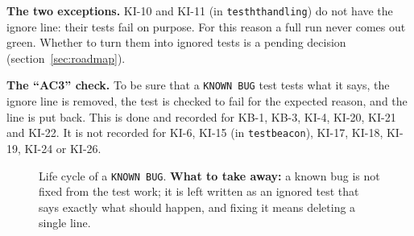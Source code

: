 \documentclass[11pt,a4paper]{article}
\DeclareRobustCommand{\_}{\textunderscore\allowbreak}
\newcommand{\cd}[1]{\texttt{#1}}
\begin{document}
\textbf{The two exceptions.} KI-10 and KI-11 (in \cd{test\_ht\_handling}) do not have the
ignore line: their tests fail on purpose. For this reason a full run never comes out green.
Whether to turn them into ignored tests is a pending decision (section~\ref{sec:roadmap}).

\textbf{The ``AC3'' check.} To be sure that a \cd{KNOWN BUG} test tests what it
says, the ignore line is removed, the test is checked to fail for the expected reason, and the line is put
back. This is done and recorded for KB-1, KB-3, KI-4, KI-20, KI-21 and KI-22. It is not recorded for
KI-6, KI-15 (in \cd{test\_beacon}), KI-17, KI-18, KI-19, KI-24 or KI-26.

\begin{figure}[H]
\centering
{}
\caption{Life cycle of a \cd{KNOWN BUG}. \textbf{What to take away:} a known bug is not fixed
from the test work; it is left written as an ignored test that says exactly what should happen,
and fixing it means deleting a single line.}
\label{fig:kb}
\end{figure}
\end{document}
